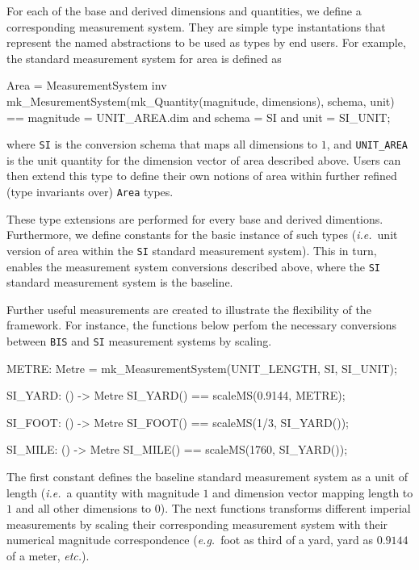 \documentclass[runningheads,a4paper]{llncs}
\begin{document}
For each of the base and derived dimensions and quantities, we define a corresponding measurement system. They are simple type instantations that represent the named abstractions to be used as types by end users. For example, the standard measurement system for area is defined as 
%
\begin{vdmsl}[frame=none,basicstyle=\ttfamily\scriptsize]
  Area = MeasurementSystem
  inv mk_MesurementSystem(mk_Quantity(magnitude, dimensions), schema, unit) == 
          magnitude = UNIT_AREA.dim and schema = SI and unit = SI_UNIT;
\end{vdmsl}
%
\noindent where \texttt{SI} is the conversion schema that maps all dimensions to \(1\), and \texttt{UNIT\_AREA} is the unit quantity for the dimension vector of area described above. Users can then extend this type to define their own notions of area within further refined (type invariants over) \texttt{Area} types.

These type extensions are performed for every base and derived dimentions. Furthermore, we define constants for the basic instance of such types (\textit{i.e.}~unit version of area within the \texttt{SI} standard measurement system). This in turn, enables the measurement system conversions described above, where the \texttt{SI} standard measurement system is the baseline.   

Further useful measurements are created to illustrate the flexibility of the framework. For instance, the functions below perfom the necessary conversions between \texttt{BIS} and \texttt{SI} measurement systems by scaling.   
%
\begin{vdmsl}[frame=none,basicstyle=\ttfamily\scriptsize]
    METRE: Metre = mk_MeasurementSystem(UNIT_LENGTH, SI, SI_UNIT);

    SI_YARD: () -> Metre
    SI_YARD() == scaleMS(0.9144, METRE);

    SI_FOOT: () -> Metre
    SI_FOOT() == scaleMS(1/3, SI_YARD());

    SI_MILE: () -> Metre
    SI_MILE() == scaleMS(1760, SI_YARD());
\end{vdmsl}
%
\noindent The first constant defines the baseline standard measurement system as a unit of length (\textit{i.e.}~a quantity with magnitude \(1\) and dimension vector mapping length to \(1\) and all other dimensions to \(0\)). The next functions transforms different imperial measurements by scaling their corresponding measurement system with their numerical magnitude correspondence (\textit{e.g.}~foot as third of a yard, yard as \(0.9144\) of a meter, \textit{etc.}). 
\end{document}
